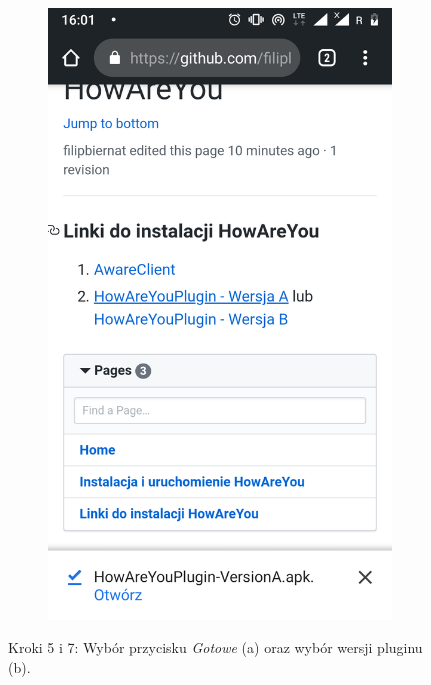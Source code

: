 \begin{enumerate}
\begin{figure}[H]
\begin{subfigure}{0.35\textwidth}
			\subcaption{\label{subfigure_a}}
		\end{subfigure}
		\begin{subfigure}{0.35\textwidth}
			\centering
			\includegraphics[scale=0.13]{dodatekA/2_7.png}
			\subcaption{\label{subfigure_b}}
		\end{subfigure}
		\caption{ Kroki 5 i 7: Wybór przycisku \textit{Gotowe} (a) oraz wybór wersji pluginu (b).}
	\end{figure}
	\clearpage
	

\end{enumerate}
